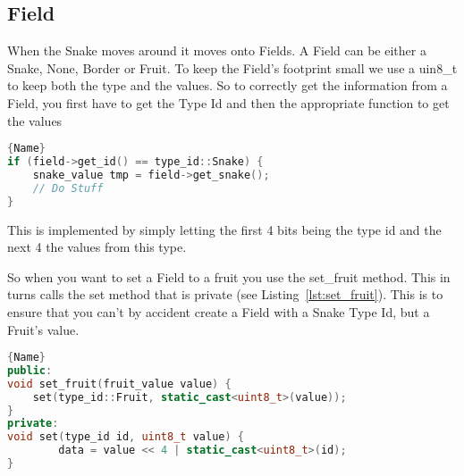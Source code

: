 \subsection{Field}

When the Snake moves around it moves onto Fields. A Field can be either a Snake, None, Border or Fruit. To keep the Field's footprint small we use a uin8\_t to keep both the type and the values. So to correctly get the information from a Field, you first have to get the Type Id and then the appropriate function to get the values

\begin{lstlisting}[caption={Getting Correct Data From a Field},label={lst:get_snake},frame=tlrb, language=C++]{Name}
if (field->get_id() == type_id::Snake) {
    snake_value tmp = field->get_snake();
    // Do Stuff
}
\end{lstlisting}

This is implemented by simply letting the first 4 bits being the type id and the next 4 the values from this type.

So when you want to set a Field to a fruit you use the set\_fruit method. This in turns calls the set method that is private (see Listing~\ref{lst:set_fruit}). This is to ensure that you can't by accident create a Field with a Snake Type Id, but a Fruit's value.

\begin{lstlisting}[caption={Updating a Field},label={lst:set_fruit},frame=tlrb, language=C++]{Name}
public:
void set_fruit(fruit_value value) {
    set(type_id::Fruit, static_cast<uint8_t>(value));
}
private:
void set(type_id id, uint8_t value) {
		data = value << 4 | static_cast<uint8_t>(id);
}
\end{lstlisting}
